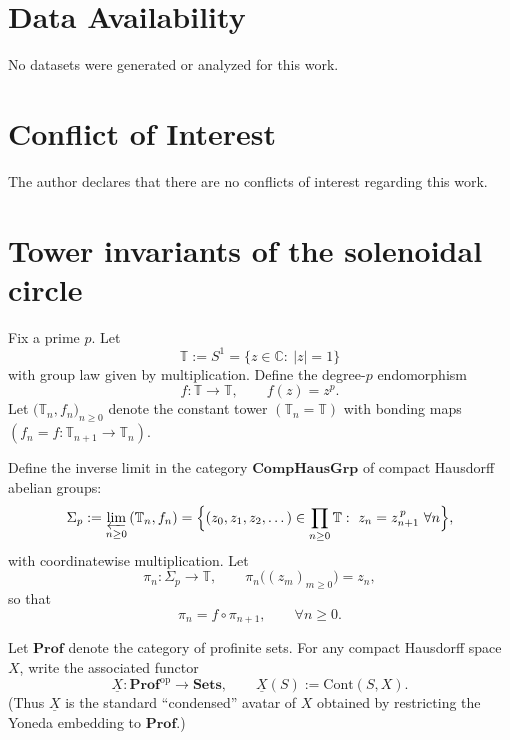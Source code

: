 \documentclass[11pt]{article}
\theoremstyle{remark}
\begin{document}
\section*{Data Availability}
No datasets were generated or analyzed for this work.
\section*{Conflict of Interest}
The author declares that there are no conflicts of interest regarding this work.

\appendix

\section{Tower invariants of the solenoidal circle}\label{app:tower-invariants} 
Fix a prime $p$. Let
\begin{equation}
\mathbb T := S^{1}=\{z\in\mathbb C:\ |z|=1\}
\end{equation}
with group law given by multiplication. Define the degree-$p$ endomorphism
\begin{equation}
f:\mathbb T\to\mathbb T,\qquad f(z)=z^{p}.
\label{A.0.1}
\end{equation}
Let $\bigl(\mathbb T_{n},f_{n}\bigr)_{n\ge 0}$ denote the constant tower $(\mathbb T_{n}=\mathbb T)$ with bonding maps $(f_{n}=f:\mathbb T_{n+1}\to\mathbb T_{n})$.

Define the inverse limit in the category $\mathbf{CompHausGrp}$ of compact Hausdorff abelian groups:
\begin{equation}
\Sigma_{p}:=\varprojlim_{n\ge 0}\,(\mathbb T_{n},f_{n})
=
\Bigl\{(z_{0},z_{1},z_{2},\dots)\in\prod_{n\ge 0}\mathbb T:\ z_{n}=z_{n+1}^{\,p}\ \forall n\Bigr\},
\label{A.0.2}
\end{equation}
with coordinatewise multiplication. Let
\begin{equation}
\pi_{n}:\Sigma_{p}\to\mathbb T,\qquad \pi_{n}\bigl((z_{m})_{m\ge 0}\bigr)=z_{n},
\label{A.0.3}
\end{equation}
so that
\begin{equation}
\pi_{n}=f\circ \pi_{n+1},\qquad \forall n\ge 0.
\label{A.0.4}
\end{equation}

Let $\mathbf{Prof}$ denote the category of profinite sets. For any compact Hausdorff space $X$, write the associated functor
\begin{equation}
\underline{X}:\mathbf{Prof}^{\mathrm{op}}\to\mathbf{Sets},\qquad
\underline{X}(S):=\mathrm{Cont}(S,X).
\label{A.0.5}
\end{equation}
(Thus $\underline{X}$ is the standard ``condensed'' avatar of $X$ obtained by restricting the Yoneda embedding to $\mathbf{Prof}$.)
\end{document}
